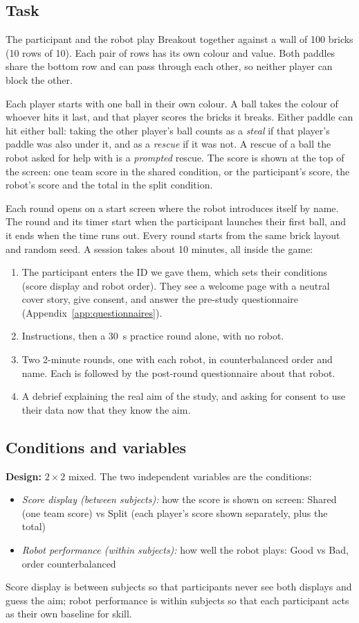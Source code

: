\subsection{Task}
The participant and the robot play Breakout together against a wall of 100 bricks (10 rows of 10). Each pair of rows has its own colour and value. Both paddles share the bottom row and can pass through each other, so neither player can block the other.

Each player starts with one ball in their own colour. A ball takes the colour of whoever hits it last, and that player scores the bricks it breaks. Either paddle can hit either ball: taking the other player's ball counts as a \textit{steal} if that player's paddle was also under it, and as a \textit{rescue} if it was not. A rescue of a ball the robot asked for help with is a \textit{prompted} rescue. The score is shown at the top of the screen: one team score in the shared condition, or the participant's score, the robot's score and the total in the split condition.

Each round opens on a start screen where the robot introduces itself by name. The round and its timer start when the participant launches their first ball, and it ends when the time runs out. Every round starts from the same brick layout and random seed. A session takes about 10 minutes, all inside the game:
\begin{enumerate}
    \item The participant enters the ID we gave them, which sets their conditions (score display and robot order). They see a welcome page with a neutral cover story, give consent, and answer the pre-study questionnaire (Appendix~\ref{app:questionnaires}).
    \item Instructions, then a 30~s practice round alone, with no robot.
    \item Two 2-minute rounds, one with each robot, in counterbalanced order and name. Each is followed by the post-round questionnaire about that robot.
    \item A debrief explaining the real aim of the study, and asking for consent to use their data now that they know the aim.
\end{enumerate}

\subsection{Conditions and variables}
\textbf{Design:} $2 \times 2$ mixed. The two independent variables are the conditions:
\begin{itemize}
    \item \textit{Score display (between subjects):} how the score is shown on screen: Shared (one team score) vs Split (each player's score shown separately, plus the total)
    \item \textit{Robot performance (within subjects):} how well the robot plays: Good vs Bad, order counterbalanced
\end{itemize}
Score display is between subjects so that participants never see both displays and guess the aim; robot performance is within subjects so that each participant acts as their own baseline for skill.

